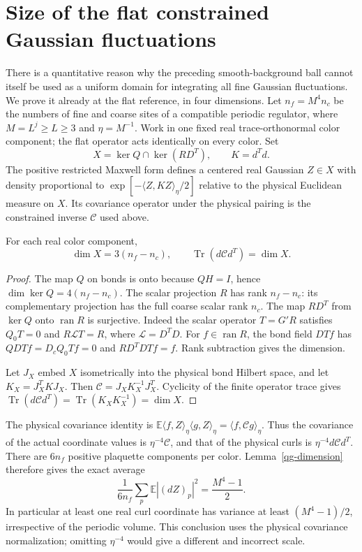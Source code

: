 \section{Size of the flat constrained Gaussian fluctuations}
\label{qg-section}

There is a quantitative reason why the preceding smooth-background
ball cannot itself be used as a uniform domain for integrating all
fine Gaussian fluctuations. We prove it already at the flat
reference, in four dimensions. Let $n_f=M^4n_c$ be the numbers
of fine and coarse sites of a compatible periodic regulator,
where $M=L^j\ge L\ge3$ and $\eta=M^{-1}$. Work in one fixed
real trace-orthonormal color component; the flat operator acts
identically on every color. Set
\[
 X=\ker Q\cap\ker(RD^T),\qquad K=d^Td.
\]
The positive restricted Maxwell form defines a centered real
Gaussian $Z\in X$ with density proportional to
$\exp[-\langle Z,KZ\rangle_\eta/2]$ relative to the
physical Euclidean measure on $X$. Its covariance operator
under the physical pairing is the constrained inverse
$\mathcal C$ used above.

\begin{lemma}\label{qg-dimension}
For each real color component,
\[
 \dim X=3(n_f-n_c),\qquad
 \operatorname{Tr}(d\mathcal C d^T)=\dim X.
\]
\end{lemma}
\begin{proof}
The map $Q$ on bonds is onto because $QH=I$, hence
$\dim\ker Q=4(n_f-n_c)$. The scalar projection $R$ has
rank $n_f-n_c$: its complementary projection has the full
coarse scalar rank $n_c$. The map $RD^T$ from $\ker Q$
onto $\operatorname{ran}R$ is surjective. Indeed the scalar
operator $T=G'R$ satisfies $Q_0T=0$ and $R\mathcal L T=R$,
where $\mathcal L=D^TD$. For $f\in\operatorname{ran}R$,
the bond field $DTf$ has $QDTf=D_cQ_0Tf=0$ and
$RD^TDTf=f$. Rank subtraction gives the dimension.

Let $J_X$ embed $X$ isometrically into the physical bond
Hilbert space, and let $K_X=J_X^TKJ_X$. Then
$\mathcal C=J_XK_X^{-1}J_X^T$. Cyclicity of the finite
operator trace gives
$\operatorname{Tr}(d\mathcal C d^T)
=\operatorname{Tr}(K_XK_X^{-1})=\dim X$.
\end{proof}

The physical covariance identity is
$\mathbb E\langle f,Z\rangle_\eta\langle g,Z\rangle_\eta
=\langle f,\mathcal Cg\rangle_\eta$.
Thus the covariance of the actual coordinate values is
$\eta^{-4}\mathcal C$, and that of the physical curls is
$\eta^{-4}d\mathcal C d^T$. There are $6n_f$ positive
plaquette components per color. Lemma~\ref{qg-dimension}
therefore gives the exact average
\begin{equation}\label{qg-curl-variance}
 \boxed{\quad
 \frac1{6n_f}\sum_p\mathbb E|(dZ)_p|^2
     =\frac{M^4-1}{2}.
 \quad}
\end{equation}
In particular at least one real curl coordinate has variance
at least $(M^4-1)/2$, irrespective of the periodic volume.
This conclusion uses the physical covariance normalization;
omitting $\eta^{-4}$ would give a different and incorrect scale.

